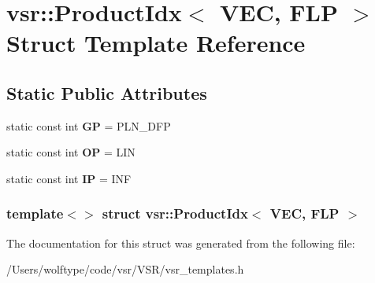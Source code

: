 \hypertarget{structvsr_1_1_product_idx_3_01_v_e_c_00_01_f_l_p_01_4}{\section{vsr\-:\-:Product\-Idx$<$ V\-E\-C, F\-L\-P $>$ Struct Template Reference}
\label{structvsr_1_1_product_idx_3_01_v_e_c_00_01_f_l_p_01_4}
}
\subsection*{Static Public Attributes}
\begin{DoxyCompactItemize}
\item 
\hypertarget{structvsr_1_1_product_idx_3_01_v_e_c_00_01_f_l_p_01_4_a5d4afd97917c652f2849a0775e244a8c}{static const int {\bfseries G\-P} = P\-L\-N\-\_\-\-D\-F\-P}\label{structvsr_1_1_product_idx_3_01_v_e_c_00_01_f_l_p_01_4_a5d4afd97917c652f2849a0775e244a8c}

\item 
\hypertarget{structvsr_1_1_product_idx_3_01_v_e_c_00_01_f_l_p_01_4_a165895903aa606328f94e2b6a61e9edd}{static const int {\bfseries O\-P} = L\-I\-N}\label{structvsr_1_1_product_idx_3_01_v_e_c_00_01_f_l_p_01_4_a165895903aa606328f94e2b6a61e9edd}

\item 
\hypertarget{structvsr_1_1_product_idx_3_01_v_e_c_00_01_f_l_p_01_4_a7dcdaa07281548cb15851a03e234c6bb}{static const int {\bfseries I\-P} = I\-N\-F}\label{structvsr_1_1_product_idx_3_01_v_e_c_00_01_f_l_p_01_4_a7dcdaa07281548cb15851a03e234c6bb}

\end{DoxyCompactItemize}
\subsubsection*{template$<$$>$ struct vsr\-::\-Product\-Idx$<$ V\-E\-C, F\-L\-P $>$}



The documentation for this struct was generated from the following file\-:\begin{DoxyCompactItemize}
\item 
/\-Users/wolftype/code/vsr/\-V\-S\-R/vsr\-\_\-templates.\-h\end{DoxyCompactItemize}
